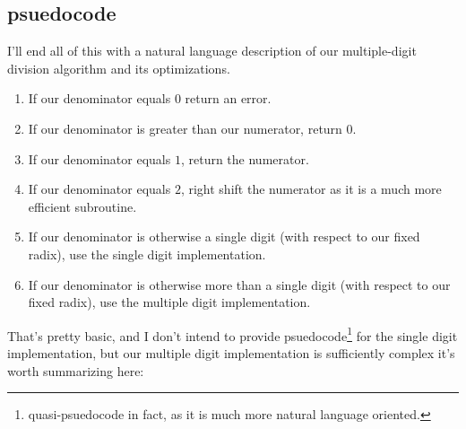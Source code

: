 \documentclass[twoside]{article}
\begin{document}
\subsection*{psuedocode}

I'll end all of this with a natural language description of our multiple-digit division algorithm and its optimizations.

\begin{enumerate}
\item If our denominator equals $ 0 $ return an error.
\item If our denominator is greater than our numerator, return $ 0 $.
\item If our denominator equals $ 1 $, return the numerator.
\item If our denominator equals $ 2 $, right shift the numerator as it is a much more efficient subroutine.
\item If our denominator is otherwise a single digit (with respect to our fixed radix), use the single digit implementation.
\item If our denominator is otherwise more than a single digit (with respect to our fixed radix), use the multiple digit implementation.
\end{enumerate}

\newpage

That's pretty basic, and I don't intend to provide psuedocode\footnote{quasi-psuedocode in fact, as it is much more natural language
oriented.} for the single digit implementation, but our multiple digit implementation is sufficiently complex it's worth summarizing here:
\end{document}
